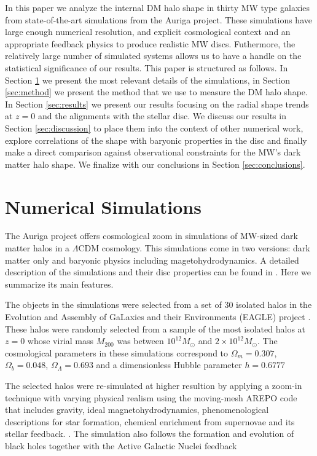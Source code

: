 \documentclass[usenatbib]{mnras}
\begin{document}
In this paper we analyze the internal DM halo shape in thirty MW type
galaxies from state-of-the-art simulations from the Auriga project.
These simulations have large enough numerical resolution, and explicit
cosmological context and an appropriate feedback physics to produce
realistic MW discs.
Futhermore, the relatively large number of simulated systems allows us
to have a handle on the statistical significance of our results.
This paper is structured as follows. 
In Section \ref{sec:numerical} we present the most relevant details of
the simulations, in Section \ref{sec:method} we present the method
that we use to measure the DM halo shape. 
In Section \ref{sec:results} we present our results focusing on the
radial shape trends at $z=0$ and the alignments with the stellar disc.
We discuss our results in Section \ref{sec:discussion} to place them
into the context of other numerical work, explore correlations of the
shape with baryonic properties in the disc and finally make a direct
comparison against observational constraints for the MW's dark matter halo shape.
We finalize with our conclusions in Section \ref{sec:conclusions}.


\section{Numerical Simulations}
\label{sec:numerical}

The Auriga project offers cosmological zoom in simulations of MW-sized 
dark matter halos in a $\Lambda$CDM cosmology. 
This simulations come in two versions: dark matter only and
baryonic physics including magetohydrodynamics.
A detailed description of the simulations and their disc properties
can be found in \citep{auriga}.
Here we summarize its main features.

The objects in the simulations were selected from a set of 30
isolated halos in the Evolution and Assembly of GaLaxies and their
Environments (EAGLE)  project \citep{Eagle}.   
These halos were randomly selected from a sample of the most isolated
halos at $z=0$ whose virial mass $M_{200}$ was between $10^{12}M_\odot$ and
$2\times 10^{12}M_\odot$. 
The cosmological parameters in these simulations correspond to
$\Omega_m=0.307$, $\Omega_b=0.048$, $\Omega_\Lambda=0.693$ and a
dimensionless Hubble parameter $h=0.6777$ \citep{2014A&A...571A..16P}

The selected halos were re-simulated at higher resultion by applying a
zoom-in technique with varying physical realism using the moving-mesh AREPO code
that includes gravity, ideal magnetohydrodynamics,  phenomenological
descriptions for star formation, chemical enrichment from supernovae
and its stellar feedback.   
\citep{arepo,2013MNRAS.432..176P}.
The simulation also follows the formation and evolution of black holes
together with the Active Galactic Nuclei feedback
\end{document}
